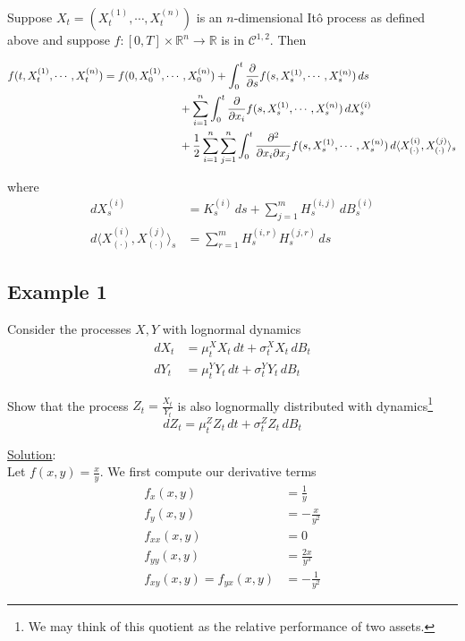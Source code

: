 \documentclass[12pt]{article}
\newenvironment{theorem}[2][Theorem:]{\begin{trivlist} %
\item[\hskip \labelsep {\bfseries #1}\hskip \labelsep {\bfseries #2.}]}{\end{trivlist}}
\begin{document}
\begin{theorem}{It\^{o}'s Formula in $n$-dimensions} Suppose $X_t = (X^{(1)}_t,\cdots,X^{(n)}_t)$ is an $n$-dimensional It\^{o} process as defined above and suppose $f:[0,T]\times\mathbb R^n \rightarrow \mathbb R$ is in $\mathcal C^{1,2}$. Then

\begin{align*}
	f(t,X^{(1)}_t,\cdots,X^{(n)}_t) &= f(0,X^{(1)}_0,\cdots,X^{(n)}_0) + \int^t_0 \frac{\partial}{\partial s} f(s,X^{(1)}_s,\cdots,X^{(n)}_s)\,ds\\
	&\hphantom{{}={f(0,X^{(1)}_0,\cdots}}
	+ \sum^n_{i = 1}\int^t_0 \frac{\partial}{\partial x_i}f(s,X^{(1)}_s,\cdots,X^{(n)}_s)\,dX^{(i)}_s \\
	&\hphantom{{}={f(0,X^{(1)}_0,\cdots}} + \frac{1}{2}\sum^n_{i=1}\sum^n_{j=1}\int^t_0\frac{\partial^2}{\partial x_i\partial x_j}f(s,X^{(1)}_s,\cdots,X^{(n)}_s)\,d\langle X^{(i)}_{(\cdot)},X^{(j)}_{(\cdot)}\rangle_s
\end{align*}

where
\begin{align*}
	dX^{(i)}_s &= K^{(i)}_s\,ds + \sum^m_{j=1}H^{(i,j)}_s\,dB^{(i)}_s \\
	d\langle X^{(i)}_{(\cdot)},X^{(j)}_{(\cdot)}\rangle_s &= \sum^m_{r=1} H^{(i,r)}_sH^{(j,r)}_s\,ds
\end{align*}
\end{theorem}

\subsection{Example 1}

Consider the processes $X, Y$ with lognormal dynamics
\begin{align*}
	dX_t &= \mu^X_tX_t\,dt + \sigma^X_tX_t\,dB_t \\
	dY_t &= \mu^Y_tY_t\,dt + \sigma^Y_tY_t\,dB_t
\end{align*}

Show that the process $Z_t = \frac{X_t}{Y_t}$ is also lognormally distributed with dynamics\footnote{We may think of this quotient as the relative performance of two assets.}
\begin{equation*}
	dZ_t = \mu^Z_tZ_t\,dt + \sigma^Z_tZ_t\,dB_t
\end{equation*}

\underline{Solution}: \\

Let $f(x,y) = \frac{x}{y}$. We first compute our derivative terms
\begin{align*}
	f_x(x,y) &= \frac{1}{y} \\
	f_y(x,y) &= -\frac{x}{y^2} \\
	f_{xx}(x,y) &= 0 \\
	f_{yy}(x,y) &= \frac{2x}{y^3} \\
	f_{xy}(x,y) = f_{yx}(x,y) &= -\frac{1}{y^2}
\end{align*}
\end{document}
